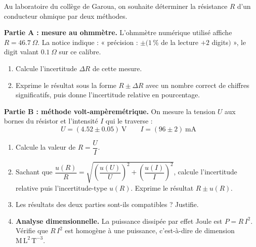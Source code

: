 \documentclass[11pt]{article}
\begin{document}
\begin{exercice}
Au laboratoire du collège de Garoua, on souhaite déterminer la résistance $R$ d'un conducteur ohmique par deux méthodes.

\textbf{Partie A : mesure au ohmmètre.} L'ohmmètre numérique utilisé affiche $R = \num{46,7}~\Omega$. La notice indique : « précision : $\pm(1\,\%$ de la lecture $+ 2$ digits$)$ », le digit valant $\num{0,1}~\Omega$ sur ce calibre.
\begin{enumerate}
    \item Calcule l'incertitude $\Delta R$ de cette mesure.
    \item Exprime le résultat sous la forme $R \pm \Delta R$ avec un nombre correct de chiffres significatifs, puis donne l'incertitude relative en pourcentage.
\end{enumerate}

\textbf{Partie B : méthode volt-ampèremétrique.} On mesure la tension $U$ aux bornes du résistor et l'intensité $I$ qui le traverse :
\[ U = (\num{4,52} \pm \num{0,05})~\text{V} \qquad I = (\num{96} \pm \num{2})~\text{mA} \]
\begin{enumerate}[resume]
    \item Calcule la valeur de $R = \dfrac{U}{I}$.
    \item Sachant que $\dfrac{u(R)}{R} = \sqrt{\left(\dfrac{u(U)}{U}\right)^2 + \left(\dfrac{u(I)}{I}\right)^2}$, calcule l'incertitude relative puis l'incertitude-type $u(R)$. Exprime le résultat $R \pm u(R)$.
    \item Les résultats des deux parties sont-ils compatibles ? Justifie.
    \item \textbf{Analyse dimensionnelle.} La puissance dissipée par effet Joule est $P = R\,I^2$. Vérifie que $R\,I^2$ est homogène à une puissance, c'est-à-dire de dimension $\text{M}\,\text{L}^2\,\text{T}^{-3}$.
\end{enumerate}
\end{exercice}
\end{document}
